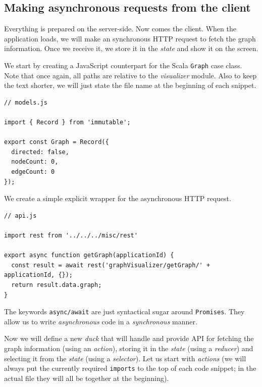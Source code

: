\subsection{Making asynchronous requests from the client}
\label{sec:implementation:integrating-visualizer:8}

Everything is prepared on the server-side. Now comes the client. When the application loads, we will make an synchronous HTTP request to fetch the graph information. Once we receive it, we store it in the \emph{state} and show it on the screen.

We start by creating a JavaScript counterpart for the Scala \texttt{Graph} case class. Note that once again, all paths are relative to the \emph{visualizer} module. Also to keep the text shorter, we will just state the file name at the beginning of each snippet.

\begin{verbatim}
// models.js

import { Record } from 'immutable';

export const Graph = Record({
  directed: false,
  nodeCount: 0,
  edgeCount: 0
});
\end{verbatim}

We create a simple explicit wrapper for the asynchronous HTTP request.

\begin{verbatim}
// api.js

import rest from '../../../misc/rest'

export async function getGraph(applicationId) {
  const result = await rest('graphVisualizer/getGraph/' + applicationId, {});
  return result.data.graph;
}
\end{verbatim}

The keywords \texttt{async/await} are just syntactical sugar around \texttt{Promises}. They allow us to write \emph{asynchronous} code in a \emph{synchronous} manner.

Now we will define a new \emph{duck} that will handle and provide API for fetching the graph information (using an \emph{action}), storing it in the \emph{state} (using a \emph{reducer}) and selecting it from the \emph{state} (using a \emph{selector}). Let us start with \emph{actions} (we will always put the currently required \texttt{imports} to the top of each code snippet; in the actual file they will all be together at the beginning).

